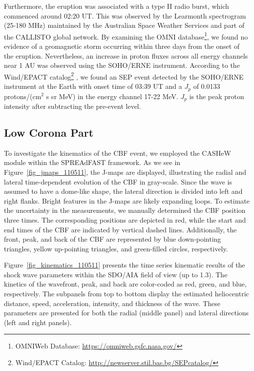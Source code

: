 Furthermore, the eruption was associated with a type II radio burst, which commenced around 02:20 UT. This was observed by the Learmonth spectrogram (25-180 MHz) maintained by the Australian Space Weather Services and part of the CALLISTO global network. By examining the OMNI database\footnote{OMNIWeb Database: \url{https://omniweb.gsfc.nasa.gov/}}, we found no evidence of a geomagnetic storm occurring within three days from the onset of the eruption. Nevertheless, an increase in proton fluxes across all energy channels near 1 AU was observed using the SOHO/ERNE instrument. According to the Wind/EPACT catalog\footnote{Wind/EPACT Catalog: \url{http://newserver.stil.bas.bg/SEPcatalog/}} \cite{miteva_2016, miteva_2017}, we found an SEP event detected by the SOHO/ERNE instrument at the Earth with onset time of 03:39 UT and a $J_p$ of 0.0133 protons/(cm$^2$ s sr MeV) in the energy channel 17-22 MeV. $J_p$ is the peak proton intensity after subtracting the pre-event level.

\subsection{Low Corona Part}
To investigate the kinematics of the CBF event, we employed the CASHeW module within the SPREAdFAST framework. As we see in Figure~\ref{fig_jmaps_110511}, the J-maps are displayed, illustrating the radial and lateral time-dependent evolution of the CBF in gray-scale. Since the wave is assumed to have a dome-like shape, the lateral direction is divided into left and right flanks. Bright features in the J-maps are likely expanding loops. To estimate the uncertainty in the measurements, we manually determined the CBF position three times. The corresponding positions are depicted in red, while the start and end times of the CBF are indicated by vertical dashed lines. Additionally, the front, peak, and back of the CBF are represented by blue down-pointing triangles, yellow up-pointing triangles, and green-filled circles, respectively.

Figure~\ref{fig_kinematics_110511} presents the time series kinematic results of the shock wave parameters within the SDO/AIA field of view (up to 1.3\rsun). The kinetics of the wavefront, peak, and back are color-coded as red, green, and blue, respectively. The subpanels from top to bottom display the estimated heliocentric distance, speed, acceleration, intensity, and thickness of the wave. These parameters are presented for both the radial (middle panel) and lateral directions (left and right panels).

